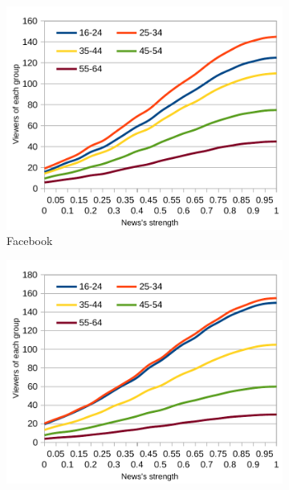 \begin{figure}[!ht]
  \begin{subfigure}[l]{0.32\textwidth}
    \begin{center}
      \includegraphics[width=1\textwidth]{charts/second-test-fb.pdf}
    \end{center}
    \vspace*{-10pt}
    \caption{Facebook}
    \label{img:result_test_2_fb}
  \end{subfigure}  
  \begin{subfigure}[c]{0.32\textwidth}
    \begin{center}
      \includegraphics[width=1\textwidth]{charts/second-test-tw.pdf}

\end{center}
\end{subfigure}
\end{figure}
